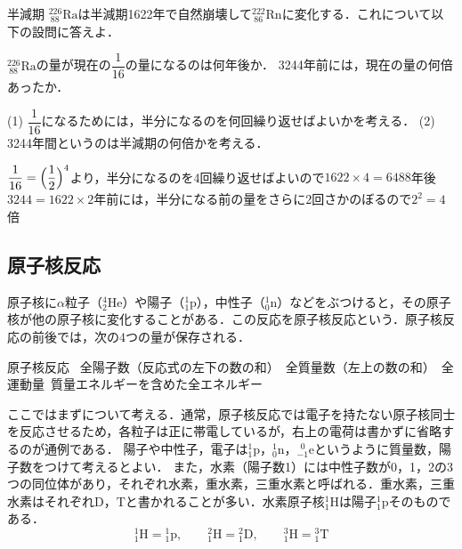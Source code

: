 \bsNeed{44mm}
\begin{reidaiunit}
\begin{reidai}{半減期}
\hspace{1zw}${}^{226}_{\ 88}\mathrm{Ra}$は半減期1622年で自然崩壊して${}^{222}_{\ 86}\mathrm{Rn}$に変化する．これについて以下の設問に答えよ．
\begin{komon}
 ${}^{226}_{\ 88}\mathrm{Ra}$の量が現在の$\dfrac{1}{16}$の量になるのは何年後か．
 3244年前には，現在の量の何倍あったか．
\end{komon}
\end{reidai}

\begin{sisinE}
(1) $\dfrac{1}{16}$になるためには，半分になるのを何回繰り返せばよいかを考える．
(2) 3244年間というのは半減期の何倍かを考える．
\end{sisinE}


\begin{kaitou}
\begin{komon}
 $\dfrac{1}{16}=\Bigl(\dfrac{1}{2}\Bigr)^4$より，半分になるのを4回繰り返せばよいので\quad $1622\times 4=6488$年後\Ans
{} $3244=1622\times 2$年前には，半分になる前の量をさらに2回さかのぼるので\quad $2^2=4$倍\Ans
\end{komon}
\end{kaitou}
\end{reidaiunit}

\subsection{原子核反応}

原子核に$\alpha$粒子（${}^4_2\mathrm{He}$）や陽子（${}^1_1\mathrm{p}$），中性子（${}^1_0\mathrm{n}$）などをぶつけると，その原子核が他の原子核に変化することがある．この反応を{\gtfamily 原子核反応}という．原子核反応の前後では，次の4つの量が保存される．

\bsNeed{24mm}
\begin{matome}{原子核反応}
 \hspace{3mm} \ 全陽子数（反応式の左下の数の和）\quad {}\ 全質量数（左上の数の和）\quad {}\ 全運動量\quad {}\ 質量エネルギーを含めた全エネルギー
\end{matome}

ここではまずについて考える．通常，原子核反応では電子を持たない原子核同士を反応させるため，各粒子は正に帯電しているが，右上の電荷は書かずに省略するのが通例である．
陽子や中性子，電子は${}^1_1\mathrm{p}$，${}^1_0\mathrm{n}$，${}^{\ \ 0}_{-1}\mathrm{e}$というように質量数，陽子数をつけて考えるとよい．
また，水素（陽子数1）には中性子数が0，1，2の3つの同位体があり，それぞれ水素，重水素，三重水素と呼ばれる．重水素，三重水素はそれぞれ$\mathrm{D}$，$\mathrm{T}$と書かれることが多い．水素原子核${}^1_1\mathrm{H}$は陽子${}^1_1\mathrm{p}$そのものである．
\[{}^1_1\mathrm{H}={}^1_1\mathrm{p},\qquad{}^2_1\mathrm{H}={}^2_1\mathrm{D},\qquad{}^3_1\mathrm{H}={}^3_1\mathrm{T}\]

